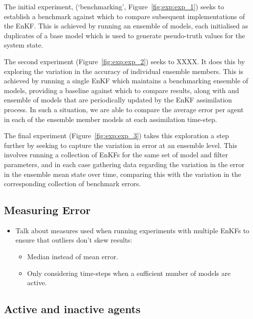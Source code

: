 \documentclass{article}
\begin{document}
The initial experiment, (`benchmarking', Figure~\ref{fig:exp:exp_1}) seeks to establish a benchmark against which to compare subsequent implementations of the EnKF. 
This is achieved by running an ensemble of models, each initialised as duplicates of a base model which is used to generate pseudo-truth values for the system state.

The second experiment (Figure~\ref{fig:exp:exp_2}) seeks to XXXX. It does this by exploring the variation in the accuracy of individual ensemble members. 
This is achieved by running a single EnKF which maintains a benchmarking ensemble of models, providing a baseline against which to compare results, along with and ensemble of models that are periodically updated by the EnKF assimilation process. In such a situation, we are able to compare the average error per agent in each of the ensemble member models at each assimilation time-step.

The final experiment (Figure~\ref{fig:exp:exp_3}) takes this exploration a step further by seeking to capture the variation in error at an ensemble level. This involves running a collection of EnKFs for the same set of model and filter parameters, and in each case gathering data regarding the variation in the error in the ensemble mean state over time, comparing this with
the variation in the corresponding collection of benchmark errors.

\subsection{Measuring Error}\label{sec:error}

\begin{itemize}
    \item Talk about measures used when running experiments with multiple EnKFs
        to ensure that outliers don't skew results:
    \begin{itemize}
        \item Median instead of mean error.
        \item Only considering time-steps when a sufficient number of models are
            active.
    \end{itemize}
\end{itemize}

\subsection{Active and inactive agents}
\end{document}
